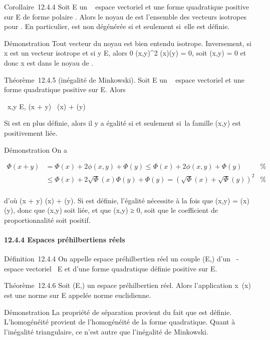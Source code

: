 \documentclass[]{article}
\begin{document}
Corollaire~12.4.4 Soit E un ~ espace vectoriel et \Phi une forme
quadratique positive sur E de forme polaire \phi. Alors le noyau de \Phi est
l'ensemble des vecteurs isotropes pour \Phi. En particulier, \Phi est non
dégénérée si et seulement si~elle est définie.

Démonstration Tout vecteur du noyau est bien entendu isotrope.
Inversement, si x est un vecteur isotrope et si y \in E, alors 0 \leq
\phi(x,y)^2 \leq \Phi(x)\Phi(y) = 0, soit \phi(x,y) = 0 et donc x est dans
le noyau de \phi.

Théorème~12.4.5 (inégalité de Minkowski). Soit E un ~ espace vectoriel
et \Phi une forme quadratique positive sur E. Alors

\forall~x,y \in E, \sqrt\Phi(x + y)~
\leq\sqrt\Phi(x) + \sqrt\Phi(y)

Si \Phi est en plus définie, alors il y a égalité si et seulement si~la
famille (x,y) est positivement liée.

Démonstration On a

\begin{align*} \Phi(x + y)& = \Phi(x) + 2\phi(x,y) + \Phi(y) \leq
\Phi(x) + 2\phi(x,y) + \Phi(y)& \%&
\\ & \leq \Phi(x) +
2\sqrt\Phi(x)\Phi(y) + \Phi(y) = \left
(\sqrt\Phi(x) +
\sqrt\Phi(y)\right )^2& \%&
\\ \end{align*}

d'où \sqrt\Phi(x + y) \leq\sqrt\Phi(x) +
\sqrt\Phi(y). Si \Phi est définie, l'égalité nécessite à la
fois que \phi(x,y) = \sqrt\Phi(x)\Phi(y),
donc que (x,y) soit liée, et que \phi(x,y) ≥ 0, soit que le coefficient de
proportionnalité soit positif.

\paragraph{12.4.4 Espaces préhilbertiens réels}

Définition~12.4.4 On appelle espace préhilbertien réel un couple (E,\Phi)
d'un ~-espace vectoriel ~E et d'une forme quadratique définie positive
sur E.

Théorème~12.4.6 Soit (E,\Phi) un espace préhilbertien réel. Alors
l'application x\mapsto~\sqrt\Phi(x)
est une norme sur E appelée norme euclidienne.

Démonstration La propriété de séparation provient du fait que \Phi est
définie. L'homogénéité provient de l'homogénéité de la forme
quadratique. Quant à l'inégalité triangulaire, ce n'est autre que
l'inégalité de Minkowski.
\end{document}
